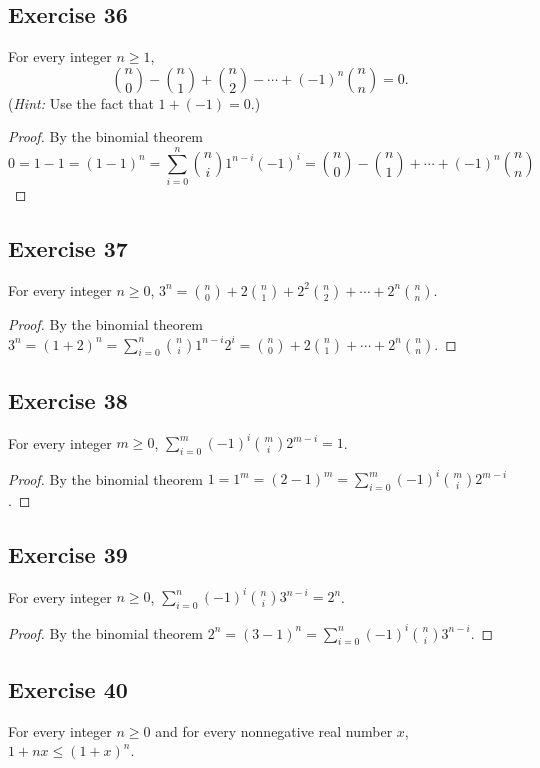 \documentclass[14pt]{extarticle}
\newcommand{\dps}{\displaystyle}
\begin{document}
\subsection{Exercise 36}
For every integer \(n \geq 1\),
\[
\binom{n}{0} - \binom{n}{1} + \binom{n}{2} - \cdots + (-1)^n \binom{n}{n} = 0.
\]
({\it Hint:} Use the fact that \(1 + (-1) = 0\).)

\begin{proof}
By the binomial theorem
\[
0 = 1-1 = (1-1)^n = \sum_{i=0}^{n}\binom{n}{i}1^{n-i}(-1)^i = \binom{n}{0} - \binom{n}{1} + \cdots + (-1)^n \binom{n}{n}
\]
\end{proof}

\subsection{Exercise 37}
For every integer \(n \geq 0\), \( 3^n = \binom{n}{0} + 2\binom{n}{1} + 2^2\binom{n}{2} + \cdots + 2^n\binom{n}{n}.\)

\begin{proof}
By the binomial theorem \(3^n = (1+2)^n = \sum_{i=0}^{n}\binom{n}{i}1^{n-i}2^i = \binom{n}{0} + 2\binom{n}{1} + \cdots 
+ 2^n\binom{n}{n}\).
\end{proof}

\subsection{Exercise 38}
For every integer \(m \geq 0\), \(\dps \sum_{i=0}^{m} (-1)^i \binom{m}{i}2^{m-i} = 1\).

\begin{proof}
By the binomial theorem \(1 = 1^m = (2-1)^m = \sum_{i=0}^{m} (-1)^i \binom{m}{i}2^{m-i}\).
\end{proof}

\subsection{Exercise 39}
For every integer \(n \geq 0\), \(\dps \sum_{i=0}^{n} (-1)^i \binom{n}{i}3^{n-i} = 2^n\).

\begin{proof}
By the binomial theorem \(2^n = (3-1)^n = \sum_{i=0}^{n} (-1)^i \binom{n}{i}3^{n-i}.\)
\end{proof}

\subsection{Exercise 40}
For every integer \(n \geq 0\) and for every nonnegative real number \(x\), \(1 + nx \leq (1 + x)^n\).
\end{document}

